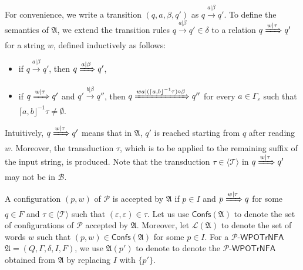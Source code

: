 \documentclass[preprint,12pt]{elsarticle}
\newcommand\Pp{{\mathcal{P} }}
\newcommand\confs{{\mathsf{Confs} }}
\newcommand\Aut{{\mathfrak{A} }}
\newcommand\Lang{{\mathscr{L} }}
\newcommand\TranSet{{\mathscr{T} }}
\newcommand\Tranbasis{{\mathscr{B} }}
\newcommand{\WOTrNFA}{\textsf{WPOTrNFA}}
\begin{document}
For convenience, we write a transition $(q, a, \beta, q')$ as $q \xrightarrow{a | \beta} q'$. 
To define the semantics of $\Aut$, we extend the transition rules $q \xrightarrow{a | \beta} q' \in \delta$  to a relation $q \xRightarrow{w | \tau} q'$ for a string $w$,  
%
defined inductively as follows:
\begin{itemize}
	\item if $q \xrightarrow{a |\beta} q'$, then $q \xRightarrow{a | \beta} q'$, 
	\item if $q \xRightarrow{w | \tau} q'$ and $q' \xrightarrow{b |\beta } q'' $, then $q \xRightarrow{w a | (\lceil a, b\rfloor^{-1}\tau) \circ \beta} q''$ for every $a \in \Gamma_\varepsilon$ such that $\lceil a, b\rfloor^{-1}\tau \neq \emptyset$.
\end{itemize}
Intuitively, $q \xRightarrow{w | \tau} q'$ means that in $\Aut$,  $q'$ is reached starting from $q$ after reading $w$. Moreover, the transduction $\tau$, which is  to be applied to the remaining suffix of the input string, is produced. Note that the transduction  $\tau \in \langle \TranSet \rangle$ in $q \xRightarrow{w | \tau} q'$ may not be in $\Tranbasis$. 

A configuration $(p, w)$ of $\Pp$ is accepted by $\Aut$ if $p\in I$ and $p \xRightarrow{w | \tau} q$ for some $q \in F$ and $\tau \in \langle \TranSet \rangle$ such that $(\varepsilon, \varepsilon) \in \tau$.
%
Let us use $\confs(\Aut)$ to denote the set of configurations of $\Pp$ accepted by $\Aut$.
Moreover, let $\Lang(\Aut)$ to denote the set of words $w$ such that $(p, w)\in\confs(\Aut)$ for some $p \in I$.
For a $\Pp$-$\WOTrNFA$ $\Aut = (Q, \Gamma, \delta, I, F)$, we use $\Aut(p')$ to denote to denote the $\Pp$-$\WOTrNFA$ obtained from $\Aut$ by replacing $I$ with $\{p'\}$.
\end{document}
